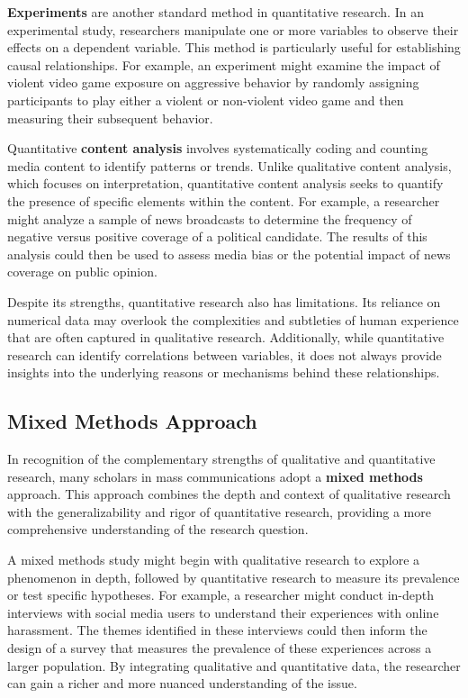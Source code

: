 \documentclass[
]{book}
\begin{document}
\textbf{Experiments} are another standard method in quantitative research. In an experimental study, researchers manipulate one or more variables to observe their effects on a dependent variable. This method is particularly useful for establishing causal relationships. For example, an experiment might examine the impact of violent video game exposure on aggressive behavior by randomly assigning participants to play either a violent or non-violent video game and then measuring their subsequent behavior.

Quantitative \textbf{content analysis} involves systematically coding and counting media content to identify patterns or trends. Unlike qualitative content analysis, which focuses on interpretation, quantitative content analysis seeks to quantify the presence of specific elements within the content. For example, a researcher might analyze a sample of news broadcasts to determine the frequency of negative versus positive coverage of a political candidate. The results of this analysis could then be used to assess media bias or the potential impact of news coverage on public opinion.

Despite its strengths, quantitative research also has limitations. Its reliance on numerical data may overlook the complexities and subtleties of human experience that are often captured in qualitative research. Additionally, while quantitative research can identify correlations between variables, it does not always provide insights into the underlying reasons or mechanisms behind these relationships.

\subsection*{Mixed Methods Approach}\label{mixed-methods-approach}

In recognition of the complementary strengths of qualitative and quantitative research, many scholars in mass communications adopt a \textbf{mixed methods} approach. This approach combines the depth and context of qualitative research with the generalizability and rigor of quantitative research, providing a more comprehensive understanding of the research question.

A mixed methods study might begin with qualitative research to explore a phenomenon in depth, followed by quantitative research to measure its prevalence or test specific hypotheses. For example, a researcher might conduct in-depth interviews with social media users to understand their experiences with online harassment. The themes identified in these interviews could then inform the design of a survey that measures the prevalence of these experiences across a larger population. By integrating qualitative and quantitative data, the researcher can gain a richer and more nuanced understanding of the issue.
\end{document}
